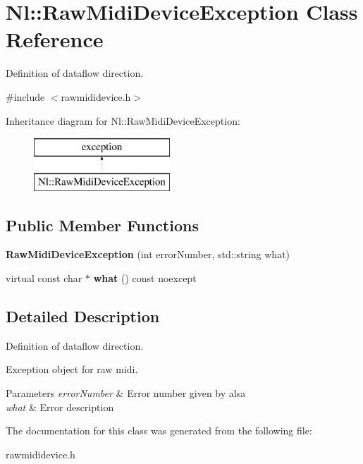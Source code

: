 \hypertarget{classNl_1_1RawMidiDeviceException}{}\section{Nl\+:\+:Raw\+Midi\+Device\+Exception Class Reference}
\label{classNl_1_1RawMidiDeviceException}


Definition of dataflow direction.  




{\ttfamily \#include $<$rawmididevice.\+h$>$}

Inheritance diagram for Nl\+:\+:Raw\+Midi\+Device\+Exception\+:\begin{figure}[H]
\begin{center}
\leavevmode
\includegraphics[height=2.000000cm]{classNl_1_1RawMidiDeviceException}
\end{center}
\end{figure}
\subsection*{Public Member Functions}
\begin{DoxyCompactItemize}
\item 
\hypertarget{classNl_1_1RawMidiDeviceException_a79b838431bf9ea9f8666684c38c036f7}{}{\bfseries Raw\+Midi\+Device\+Exception} (int error\+Number, std\+::string what)\label{classNl_1_1RawMidiDeviceException_a79b838431bf9ea9f8666684c38c036f7}

\item 
\hypertarget{classNl_1_1RawMidiDeviceException_accb4385315338ccc4ecc904fd69ab2d9}{}virtual const char $\ast$ {\bfseries what} () const noexcept\label{classNl_1_1RawMidiDeviceException_accb4385315338ccc4ecc904fd69ab2d9}

\end{DoxyCompactItemize}


\subsection{Detailed Description}
Definition of dataflow direction. 

Exception object for raw midi.


\begin{DoxyParams}{Parameters}
{\em error\+Number} & Error number given by alsa \\
\hline
{\em what} & Error description \\
\hline
\end{DoxyParams}


The documentation for this class was generated from the following file\+:\begin{DoxyCompactItemize}
\item 
rawmididevice.\+h\end{DoxyCompactItemize}
